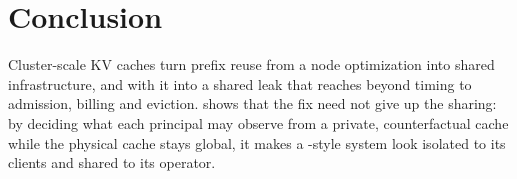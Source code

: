 \section{Conclusion}
\label{sec:conclusion}

Cluster-scale KV caches turn prefix reuse from a node optimization into shared
infrastructure, and with it into a shared leak that reaches beyond timing to
admission, billing and eviction. \sys shows that the fix need not give up the
sharing: by deciding what each principal may observe from a private,
counterfactual cache while the physical cache stays global, it makes a
\mc-style system look isolated to its clients and shared to its operator.
